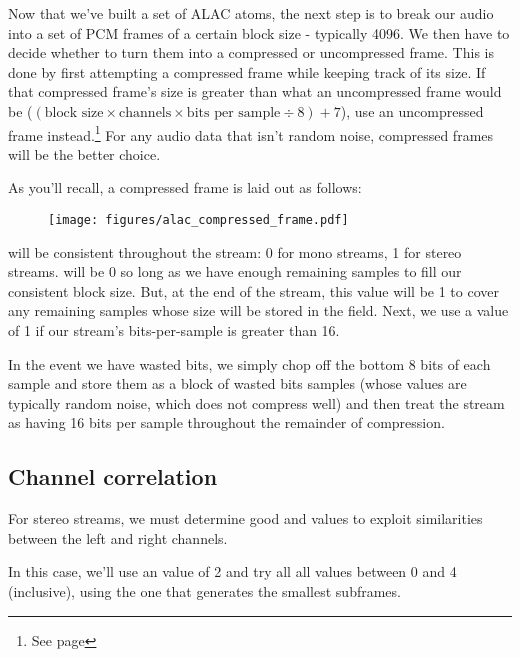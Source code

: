 Now that we've built a set of ALAC atoms, the next step is to break
our audio into a set of PCM frames of a certain block size -
typically 4096.
We then have to decide whether to turn them into a compressed
or uncompressed frame.
This is done by first attempting a compressed frame while keeping
track of its size.
If that compressed frame's size is greater than what an
uncompressed frame would be
($(\text{block size} \times \text{channels} \times \text{bits per sample} \div 8) + 7$), use an uncompressed frame instead.\footnote{See page \pageref{alac_uncompressed}}
For any audio data that isn't random noise, compressed frames
will be the better choice.

As you'll recall, a compressed frame is laid out as follows:

\begin{figure}[h]
\texttt{[image: figures/alac\_compressed\_frame.pdf]}
\end{figure}
\par
\noindent
{} will be consistent throughout the stream:
0 for mono streams, 1 for stereo streams.
 will be 0 so long as we have enough
remaining samples to fill our consistent block size.
But, at the end of the stream, this value will be 1 to cover any
remaining samples whose size will be stored in the  field.
Next, we use a  value of 1 if our stream's bits-per-sample
is greater than 16.

In the event we have wasted bits, we simply chop off the bottom 8 bits
of each sample and store them as a block of wasted bits samples
(whose values are typically random noise, which does not compress well)
and then treat the stream as having 16 bits per sample
throughout the remainder of compression.

\clearpage

\subsection{Channel correlation}

For stereo streams, we must determine good 
and  values to exploit similarities
between the left and right channels.

In this case, we'll use an  value of 2
and try all all  values between 0 and 4
(inclusive), using the one that generates the smallest subframes.

